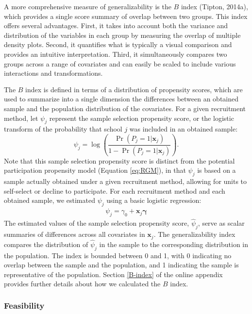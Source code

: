 \documentclass[
  man,floatsintext]{apa6}
\begin{document}
A more comprehensive measure of generalizability is the \(B\) index (Tipton, 2014a), which provides a single score summary of overlap between two groups. This index offers several advantages. First, it takes into account both the variance and distribution of the variables in each group by measuring the overlap of multiple density plots. Second, it quantifies what is typically a visual comparison and provides an intuitive interpretation. Third, it simultaneously compares two groups across a range of covariates and can easily be scaled to include various interactions and transformations.

The \(B\) index is defined in terms of a distribution of propensity scores, which are used to summarize into a single dimension the differences between an obtained sample and the population distribution of the covariates.
For a given recruitment method, let \(\psi_j\) represent the sample selection propensity score, or the logistic transform of the probability that school \(j\) was included in an obtained sample:
\[
\psi_j = \log\left(\frac{\Pr(P_j = 1 | \mathbf{x}_j)}{1 - \Pr(P_j = 1 | \mathbf{x}_j)}\right). 
\]
Note that this sample selection propensity score is distinct from the potential participation propensity model (Equation \eqref{eq:RGM}), in that \(\psi_j\) is based on a sample actually obtained under a given recruitment method, allowing for units to self-select or decline to participate. For each recruitment method and each obtained sample, we estimated \(\psi_j\) using a basic logistic regression:
\begin{align}
\label{eq:PSA}
\psi_j = \gamma_0 + \mathbf{x}_j \boldsymbol\gamma
\end{align}
The estimated values of the sample selection propensity score, \(\hat\psi_j\), serve as scalar summaries of differences across all covariates in \(\mathbf{x}_j\).
The generalizability index compares the distribution of \(\hat\psi_j\) in the sample to the corresponding distribution in the population.
The index is bounded between 0 and 1, with 0 indicating no overlap between the sample and the population, and 1 indicating the sample is representative of the population.
Section \ref{B-index} of the online appendix provides further details about how we calculated the \(B\) index.

\hypertarget{feasibility}{%
\subsubsection*{Feasibility}\label{feasibility}}
\end{document}
